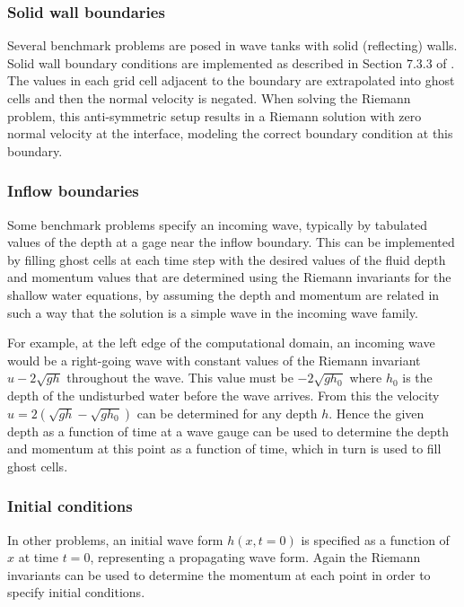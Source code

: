 \subsubsection{Solid wall boundaries}\label{sec:bc-solid}
Several benchmark problems are posed in wave tanks with solid (reflecting)
walls.  Solid wall
boundary conditions are implemented as described in Section 7.3.3 of
\cite{rjl:fvmhp}.  The values in each grid cell adjacent to the boundary are
extrapolated into ghost cells and then the normal velocity is negated.  When
solving the Riemann problem, this anti-symmetric setup results in a Riemann
solution with zero normal 
velocity at the interface, modeling the correct boundary 
condition at this boundary.

\subsubsection{Inflow boundaries}\label{sec:bc-inflow}
Some benchmark problems specify an incoming wave, typically by tabulated
values of the depth at a gage near the inflow boundary.  
This can be implemented by filling ghost cells at each time step
with the desired values of the fluid depth and momentum values that are
determined using the Riemann invariants for the shallow water equations,
by assuming the depth and momentum are related in such a way that the
solution is a simple wave in the incoming wave family.  

For example, at
the left edge of the computational domain, an incoming wave would be a
right-going wave with constant values of the
Riemann invariant $u - 2\sqrt{gh}$ throughout the wave.
This value must be $-2\sqrt{gh_0}$
where $h_0$ is the depth of the undisturbed water before the wave arrives.
From this the velocity $u = 2(\sqrt{gh} - \sqrt{gh_0})$ can be determined
for any depth $h$.  Hence the given depth as a function of time at a
wave gauge can be used to determine the depth and momentum at this
point as a function of time, which in turn is used to fill ghost
cells.

\subsubsection{Initial conditions}\label{sec:ic}
In other problems, an initial wave form $h(x,t=0)$ is specified as a
function of $x$ at time $t=0$, representing a propagating wave form.
Again the Riemann invariants can be used to
determine the momentum at each point in order to specify initial
conditions.



